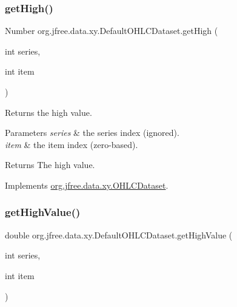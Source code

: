 \mbox{\label{classorg_1_1jfree_1_1data_1_1xy_1_1_default_o_h_l_c_dataset_a23bff0b7d14e36f42fe82fd177f050d6}} 
\subsubsection{\texorpdfstring{get\+High()}{getHigh()}}
{\footnotesize\ttfamily Number org.\+jfree.\+data.\+xy.\+Default\+O\+H\+L\+C\+Dataset.\+get\+High (\begin{DoxyParamCaption}\item[{int}]{series,  }\item[{int}]{item }\end{DoxyParamCaption})}

Returns the high value.


\begin{DoxyParams}{Parameters}
{\em series} & the series index (ignored). \\
\hline
{\em item} & the item index (zero-\/based).\\
\hline
\end{DoxyParams}
\begin{DoxyReturn}{Returns}
The high value. 
\end{DoxyReturn}


Implements \mbox{\hyperlink{interfaceorg_1_1jfree_1_1data_1_1xy_1_1_o_h_l_c_dataset_a03f647b09b1a04ae0c2eb2bc5116d4d4}{org.\+jfree.\+data.\+xy.\+O\+H\+L\+C\+Dataset}}.

\mbox{\label{classorg_1_1jfree_1_1data_1_1xy_1_1_default_o_h_l_c_dataset_a7c992f9b0fac581e574332c70329fae7}} 
\subsubsection{\texorpdfstring{get\+High\+Value()}{getHighValue()}}
{\footnotesize\ttfamily double org.\+jfree.\+data.\+xy.\+Default\+O\+H\+L\+C\+Dataset.\+get\+High\+Value (\begin{DoxyParamCaption}\item[{int}]{series,  }\item[{int}]{item }\end{DoxyParamCaption})}

